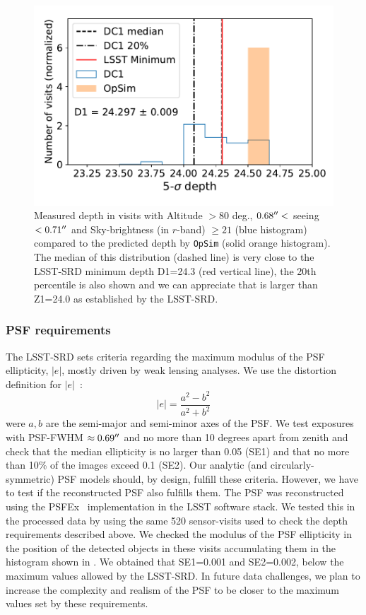 \documentclass[twocolumn]{aastex62}
\begin{document}
\begin{figure}
\centering
\includegraphics[width=0.9\columnwidth]{m5_goals}
\caption{Measured depth in visits with Altitude $>80$ deg., $0.68 \mbox{$^{\prime\prime}$} <$ seeing $ < 0.71 \mbox{$^{\prime\prime}$}$ and Sky-brightness (in $r$-band) $\geq 21$ (blue histogram) compared to the predicted depth by \texttt{OpSim} (solid orange histogram). The median of this distribution (dashed line) is very close to the LSST-SRD minimum depth D1=24.3 (red vertical line), the 20th percentile is also shown and we can appreciate that is larger than Z1=24.0 as established by the LSST-SRD.}
\label{fig:DF1_checks}
\end{figure}

\subsubsection{PSF requirements}
\label{sssec:psf}
The LSST-SRD sets criteria regarding the maximum modulus of the PSF ellipticity, $|e|$, mostly driven by weak lensing analyses. We use the distortion definition for $|e|$~\citep{1991ApJ...380....1M}:
\begin{equation}
|e| = \frac{a^{2} - b^{2}}{a^{2}+b^{2}}
\end{equation}
were $a, b$ are the semi-major and semi-minor axes of the PSF. We test exposures with PSF-FWHM $\approx 0.69\mbox{$^{\prime\prime}$}$ and no more than 10 degrees apart from zenith and check that the median ellipticity is no larger than 0.05 (SE1) and that no more than 10\% of the images exceed 0.1 (SE2). Our analytic (and circularly-symmetric) PSF models should, by design, fulfill these criteria. However, we have to test if the reconstructed PSF also fulfills them. The PSF was reconstructed using the PSFEx~\citep{2011ASPC..442..435B} implementation in the LSST software stack. We tested this in the processed data by using the same 520 sensor-visits used to check the depth requirements described above. We checked the modulus of the PSF ellipticity in the position of the detected objects in these visits accumulating them in the histogram shown in . We obtained that SE1=0.001 and SE2=0.002, below the maximum values allowed by the LSST-SRD. In future data challenges, we plan to increase the complexity and realism of the PSF to be closer to the maximum values set by these requirements.
\end{document}
